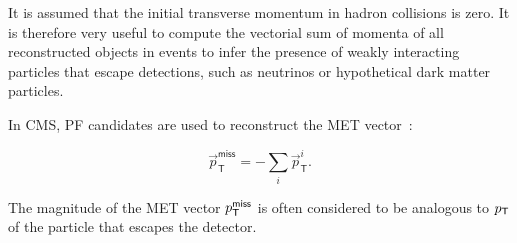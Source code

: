 It is assumed that the initial transverse momentum in hadron collisions is zero. It is therefore very useful to compute the vectorial sum of momenta of all reconstructed objects in events to infer the presence of weakly interacting particles that escape detections, such as neutrinos or hypothetical dark matter particles. 

In \ac{CMS}, \ac{PF} candidates are used to reconstruct the \ac{MET} vector~\cite{CMS:2019ctu}:

\begin{equation}
\overrightarrow{p}_{\textsf{T}}^{\textsf{miss}} = -\sum_{i} \overrightarrow{p}_{\textsf{T}}^{i}.
\end{equation}

The magnitude of the \ac{MET} vector $p_{\textsf{T}}^{\textsf{miss}}$ is often considered to be analogous to $p_{\textsf{T}}$ of the particle that escapes the detector. 